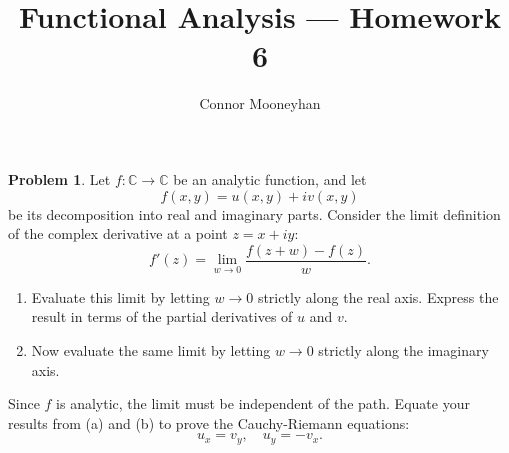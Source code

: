 \documentclass[12pt]{article}
\title{Functional Analysis --- Homework 6}
\author{Connor Mooneyhan}
\date{}
\theoremstyle{definition}
\newtheorem{ex}{Problem}
\begin{document}
\maketitle

\begin{ex}
	Let $f : \mathbb{C} \to \mathbb{C}$ be an analytic function, and let \begin{equation*}
		f(x, y) = u(x,y) + iv(x,y)
	\end{equation*}
	be its decomposition into real and imaginary parts.
	Consider the limit definition of the complex derivative at a point $z = x + iy$: \begin{equation*}
		f'(z) = \lim_{w\to 0} \frac{f(z+w) - f(z)}{w}.
	\end{equation*}
	\begin{enumerate}[label=(\alph*)]
		\item Evaluate this limit by letting $w \to 0$ strictly along the real axis.
		      Express the result in terms of the partial derivatives of $u$ and $v$.
		\item Now evaluate the same limit by letting $w \to 0$ strictly along the imaginary axis.
	\end{enumerate}
	Since $f$ is analytic, the limit must be independent of the path.
	Equate your results from (a) and (b) to prove the Cauchy-Riemann equations: \begin{equation*}
		u_x = v_y, \hspace{1em} u_y = -v_x.
	\end{equation*}
\end{ex}
\end{document}
